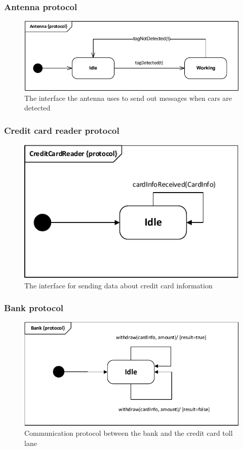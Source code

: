 \subsubsection*{Antenna protocol}
\begin{figure}[H]
\centering
\includegraphics[width=0.7\linewidth]{img/behaviour_state_machines/protocol_state_machines/protocol_state_machine_antenna}
\caption{The interface the antenna uses to send out messages when cars are detected}
\label{fig:protocol_state_machine_antenna}
\end{figure}

\subsubsection*{Credit card reader protocol}
\begin{figure}[H]
\centering
\includegraphics[width=0.7\linewidth]{img/behaviour_state_machines/protocol_state_machines/protocol_state_machine_tlc_to_ccr}
\caption{The interface for sending data about credit card information}
\label{fig:protocol_state_machine_tlc_to_ccr}
\end{figure}

\subsubsection*{Bank protocol}
\begin{figure}[H]
\centering
\includegraphics[width=0.7\linewidth]{img/behaviour_state_machines/protocol_state_machines/protocol_state_machine_tlc_to_bank}
\caption{Communication protocol between the bank and the credit card toll lane}
\label{fig:protocol_state_machine_tlc_to_bank}
\end{figure}

